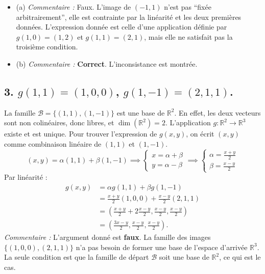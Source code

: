 \documentclass[french]{yLectureNote}
\begin{document}
\begin{itemize}
    \item (a) \emph{Commentaire :} Faux. L'image de $(-1,1)$ n'est pas ``fixée arbitrairement'', elle est contrainte par la linéarité et les deux premières données. L'expression donnée est celle d'une application définie par $g(1,0)=(1,2)$ et $g(1,1)=(2,1)$, mais elle ne satisfait pas la troisième condition.
    \item (b) \emph{Commentaire :} \textbf{Correct}. L'inconsistance est montrée.
\end{itemize}

\subsection*{3. $g(1,1)=(1,0,0)$, $g(1,-1)=(2,1,1)$.}
La famille $\mathcal{B} = \{(1,1), (1,-1)\}$ est une base de $\mathbb{R}^2$. En effet, les deux vecteurs sont non colinéaires, donc libres, et $\dim(\mathbb{R}^2) = 2$.
L'application $g: \mathbb{R}^2 \to \mathbb{R}^3$ existe et est unique.
Pour trouver l'expression de $g(x,y)$, on écrit $(x,y)$ comme combinaison linéaire de $(1,1)$ et $(1,-1)$.
$$(x,y) = \alpha(1,1) + \beta(1,-1) \implies \begin{cases} x = \alpha + \beta \\ y = \alpha - \beta \end{cases} \implies \begin{cases} \alpha = \frac{x+y}{2} \\ \beta = \frac{x-y}{2} \end{cases}$$
Par linéarité :
\begin{align*} g(x,y) &= \alpha g(1,1) + \beta g(1,-1) \\ &= \frac{x+y}{2}(1,0,0) + \frac{x-y}{2}(2,1,1) \\ &= \left(\frac{x+y}{2} + 2\frac{x-y}{2}, \frac{x-y}{2}, \frac{x-y}{2}\right) \\ &= \left(\frac{3x-y}{2}, \frac{x-y}{2}, \frac{x-y}{2}\right). \end{align*}
\emph{Commentaire :} L'argument donné est \textbf{faux}. La famille des images $\{(1,0,0), (2,1,1)\}$ n'a pas besoin de former une base de l'espace d'arrivée $\mathbb{R}^3$. La seule condition est que la famille de départ $\mathcal{B}$ soit une base de $\mathbb{R}^2$, ce qui est le cas.
\end{document}

